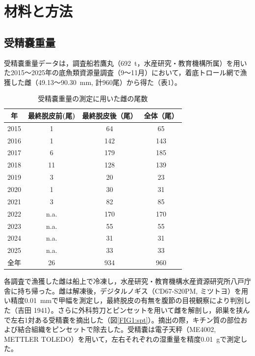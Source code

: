 \section*{材料と方法}

\subsection*{受精嚢重量}
受精嚢重量データは，調査船若鷹丸（692~t，水産研究・教育機構所属）を用いた2015～2025年の底魚類資源量調査（9～11月）において，着底トロール網で漁獲した雌（49.13～90.30~mm, 計960尾）から得た（表1）。

\begin{table}[htbp]
	\caption{受精嚢重量の測定に用いた雌の尾数}
	 \label{TBL1:ANOVA}
	 \begin{center}
	  {\setlength{\tabcolsep}{4pt}\footnotesize
	  \begin{tabular}{cccc} \hline
		年   & 最終脱皮前(尾) & 最終脱皮後（尾） & 全体（尾） \\ \hline
		2015 & 1        & 64       & 65   \\
		2016 & 1        & 142      & 143  \\
        2017 & 6        & 179      & 185  \\
        2018 & 11       & 128      & 139  \\
        2019 & 3        & 20       & 23   \\
        2020 & 1        & 30       & 31   \\
        2021 & 3        & 82       & 85   \\
        2022 & n.a.     & 170      & 170  \\
        2023 & n.a.     & 55       & 55  \\
        2024 & n.a.     & 31       & 31   \\
        2025 & n.a.     & 33       & 33   \\ \hline
        全年  & 26       & 934      & 960  \\ \hline
	  \end{tabular}}
	 \end{center}
\end{table}%

各調査で漁獲した雌は船上で冷凍し，水産研究・教育機構水産資源研究所八戸庁舎に持ち帰った。雌は解凍後，デジタルノギス（CD67-S20PM, ミツトヨ）を用い精度0.01~mmで甲幅を測定し，最終脱皮の有無を腹節の目視観察により判別した（吉田 1941）。さらに外科剪刀とピンセットを用いて雌を解剖し，卵巣を挟んで左右1対ある受精嚢を摘出した（図\ref{FIG1:spt}）。摘出の際，キチン質の部位および結合組織をピンセットで除去した。受精嚢は電子天秤（ME4002, METTLER TOLEDO）を用いて，左右それぞれの湿重量を精度0.01~gで測定した。

